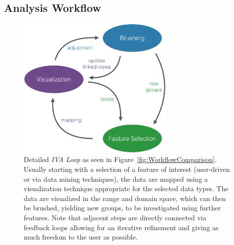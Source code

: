 \documentclass[journal]{style/vgtc} 			          %
\begin{document}
\subsection{Analysis Workflow}
\begin{figure}[htb]
 \centering
 \includegraphics[width=3.0in]{figures/InteractionLoop}
 \caption{Detailed \emph{IVA Loop} as seen in Figure~\ref{fig:WorkflowComparison}.
 Usually starting with a selection of a feature of interest (user-driven or via data mining techniques), the data are mapped using a visualization technique appropriate for the selected data types.
 The data are visualized in the range and domain space, which can then be brushed, yielding new groups, to be investigated using further features.
 Note that adjacent steps are directly connected via feedback loops allowing for an iterative refinement and giving as much freedom to the user as possible.}
 \label{fig:InteractionLoop}
\end{figure}
\end{document}
